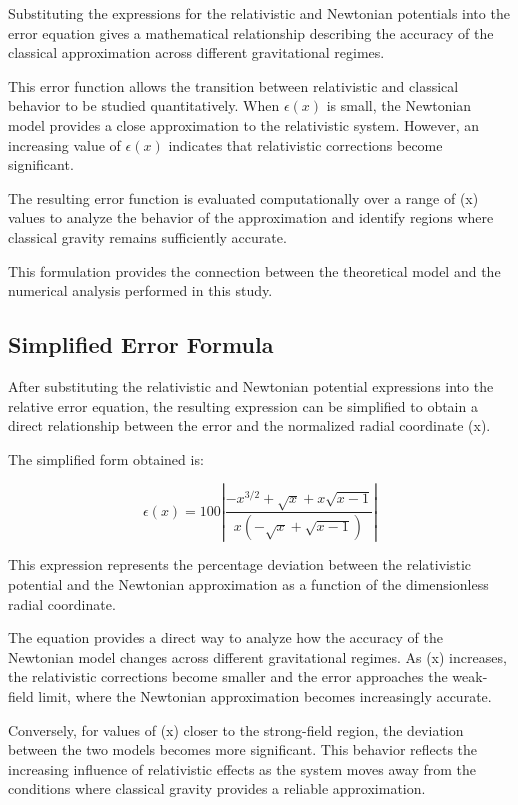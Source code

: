 \documentclass[
]{article}
\begin{document}
Substituting the expressions for the relativistic and Newtonian
potentials into the error equation gives a mathematical relationship
describing the accuracy of the classical approximation across different
gravitational regimes.

This error function allows the transition between relativistic and
classical behavior to be studied quantitatively. When $\epsilon(x)$ is
small, the Newtonian model provides a close approximation to the
relativistic system. However, an increasing value of $\epsilon(x)$
indicates that relativistic corrections become significant.

The resulting error function is evaluated computationally over a range
of (x) values to analyze the behavior of the approximation and identify
regions where classical gravity remains sufficiently accurate.

This formulation provides the connection between the theoretical model
and the numerical analysis performed in this study.

\subsection{Simplified Error Formula}\label{simplified-error-formula}

After substituting the relativistic and Newtonian potential expressions
into the relative error equation, the resulting expression can be
simplified to obtain a direct relationship between the error and the
normalized radial coordinate (x).

The simplified form obtained is:

\[
\epsilon(x)=
100
\left|\frac{
-x^{3/2}+\sqrt{x}+x\sqrt{x-1}
}
{
x(-\sqrt{x}+\sqrt{x-1})
}\right|
\]

This expression represents the percentage deviation between the
relativistic potential and the Newtonian approximation as a function of
the dimensionless radial coordinate.

The equation provides a direct way to analyze how the accuracy of the
Newtonian model changes across different gravitational regimes. As (x)
increases, the relativistic corrections become smaller and the error
approaches the weak-field limit, where the Newtonian approximation
becomes increasingly accurate.

Conversely, for values of (x) closer to the strong-field region, the
deviation between the two models becomes more significant. This behavior
reflects the increasing influence of relativistic effects as the system
moves away from the conditions where classical gravity provides a
reliable approximation.
\end{document}
